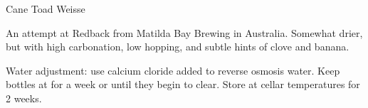 \begin{recipe}{Cane Toad Weisse}

\begin{aboutblock}
An attempt at Redback from Matilda Bay Brewing in Australia. Somewhat drier,
but with high carbonation, low hopping, and subtle hints of clove and banana.
\end{aboutblock}


\begin{methodandtiming}
 
\begin{mashsteps}
\end{mashsteps}

\begin{fermentationsteps}
\end{fermentationsteps}

\begin{directions}
Water adjustment: use  calcium cloride added to reverse osmosis water. 
Keep bottles at  for a week or until they begin to clear. Store at cellar
temperatures for 2 weeks.
\end{directions}

\end{methodandtiming}

\recipebreak

\begin{ingredientsblock}
    
\begin{malts}
\end{malts}

\begin{hops}

\end{hops}


\end{ingredientsblock}

\end{recipe}

